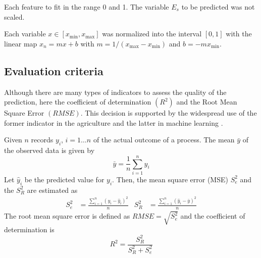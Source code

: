 Each feature  to fit in the range 0 and 1. The variable $E_s$ to be
predicted was not scaled.


Each variable $x\in[x_{\min},x_{\max}]$ was normalized into the
interval $[0,1]$ with the linear map $x_n = mx+b$ with
$m=1/(x_{\max}-x_{\min})$ and $b=-mx_{\min}$.



\subsection{Evaluation criteria}

Although there are many types of indicators to assess the quality of
the prediction, here the coefficient of determination $(R^2)$ and the
Root Mean Square Error $(RMSE)$.
%
This decision is supported by the widespread use of the former
indicator in the agriculture and the latter in machine learning
\citep{Soares2013,Soares2014,Ibrahim2014,Demir2014}.

Given $n$ records $y_i$, $i=1\ldots{}n$ of the actual outcome of a
process. The mean $\bar{y}$ of the observed data is given by
\begin{equation*}
  \bar{y} = \frac{1}{n} \sum_{i=1}^{n} y_i
\end{equation*}
Let $\hat{y}_i$ be the predicted value for $y_i$. Then, the mean
square error (MSE) $S_e^2$ and the  $S_R^2$ are estimated as
\begin{align*}
S_e^2 &= \frac{\sum_{i=1}^{n} {(y_i-\hat{y}_i)}^2 }{n} &
S_R^2 &= \frac{\sum_{i=1}^{n} {(\hat{y}_i-\bar{y})}^2 }{n}
\end{align*}
The root mean square error is defined as $RMSE = \sqrt{S_e^2}$ and the
coefficient of determination is
\begin{equation*}
R^2 = \frac{S_R^2}{S_R^2 + S_e^2}
\end{equation*}
 


